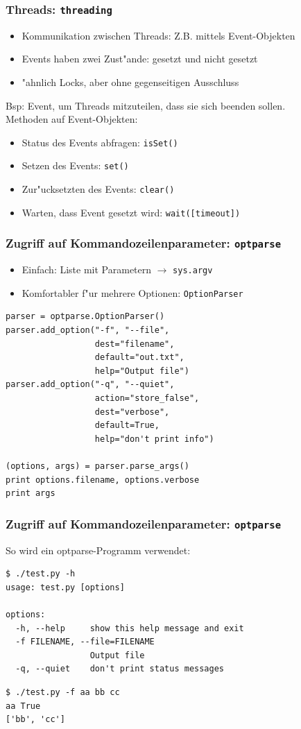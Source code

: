 \begin{frame}
\frametitle{Threads: \texttt{threading}}
\begin{itemize}
\item Kommunikation zwischen Threads: Z.B. mittels \alert{Event-Objekten}
\item Events haben zwei Zust"ande: gesetzt und nicht gesetzt
\item "ahnlich Locks, aber ohne gegenseitigen Ausschluss
\end{itemize}
Bsp: Event, um Threads mitzuteilen, dass sie sich beenden sollen.\\
Methoden auf Event-Objekten:
\begin{itemize}
\item Status des Events abfragen: \texttt{isSet()}
\item Setzen des Events: \texttt{set()}
\item Zur"ucksetzten des Events: \texttt{clear()}
\item Warten, dass Event gesetzt wird: \texttt{wait([timeout])}
\end{itemize}
\end{frame}

\begin{frame}[fragile]
\frametitle{Zugriff auf Kommandozeilenparameter: \texttt{optparse}}
\begin{itemize}
\item Einfach: Liste mit Parametern $\rightarrow$ \texttt{sys.argv}
\item Komfortabler f"ur mehrere Optionen: \texttt{OptionParser}
\end{itemize}
\begin{lstlisting}[style=Python]
parser = optparse.OptionParser()
parser.add_option("-f", "--file", 
                  dest="filename",
                  default="out.txt",
                  help="Output file")
parser.add_option("-q", "--quiet",
                  action="store_false", 
                  dest="verbose", 
                  default=True,
                  help="don't print info")

(options, args) = parser.parse_args()
print options.filename, options.verbose
print args
\end{lstlisting}
\end{frame}
\begin{frame}[fragile]
\frametitle{Zugriff auf Kommandozeilenparameter: \texttt{optparse}}
So wird ein optparse-Programm verwendet:
\begin{lstlisting}[style=Shell]
$ ./test.py -h
usage: test.py [options]

options:
  -h, --help     show this help message and exit
  -f FILENAME, --file=FILENAME
                 Output file
  -q, --quiet    don't print status messages
\end{lstlisting} %
\begin{lstlisting}[style=Shell]
$ ./test.py -f aa bb cc
aa True
['bb', 'cc']
\end{lstlisting} %
\end{frame}

